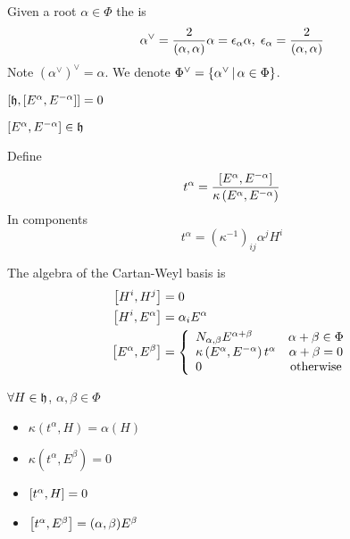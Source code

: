 \documentclass{article}
\begin{document}
\begin{definition}[Coroots]
	Given a root $\alpha\in\Phi$ the  is 
	\[
	\alpha^\vee=\frac{2}{(\alpha,\alpha)}\alpha = \eps_\alpha \alpha, \; \eps_\alpha = \frac{2}{(\alpha,\alpha)}
	\]
	Note $\left( \alpha^\vee \right)^\vee=\alpha$. We denote $\Phi^\vee = \pbrace{\alpha^\vee \, | \, \alpha \in \Phi}$. 
\end{definition}

\begin{lemma}
	$\comm[\mf{h}]{\comm[E^\alpha]{E^{-\alpha}}}=0$
\end{lemma}
\begin{corollary}
	$\comm[E^\alpha]{E^{-\alpha}} \in \mf{h}$
\end{corollary}

\begin{definition}[$t^\alpha$]
	Define 
	\[
	t^\alpha = \frac{\comm[E^\alpha]{E^{-\alpha}}}{\kappa\left(E^\alpha,E^{-\alpha}\right)}
	\]
	In components
	\[
	t^\alpha = \left( \kappa^{-1}\right)_{ij} \alpha^j H^i
	\]
\end{definition}

\begin{theorem}
	The algebra of the Cartan-Weyl basis is 
	\begin{align*}
	\comm[H^i]{H^j} &= 0 \\
	\comm[H^i]{E^\alpha} &= \alpha_i E^\alpha \\
	\comm[E^\alpha]{E^\beta} &= \left\{ \begin{array}{lc} N_{\alpha,\beta}E^{\alpha+\beta} & \alpha+\beta\in\Phi \\
	\kappa\left(E^\alpha,E^{-\alpha}\right)t^\alpha & \alpha+\beta=0 \\
	0 & \text{otherwise}
	\end{array} \right. \\
	\end{align*}
\end{theorem}

\begin{fact}
	$\forall H\in\mf{h}$, $\alpha,\beta\in\Phi$
	\begin{itemize}
		\item $\kappa\left(t^\alpha,H\right)=\alpha(H)$
		\item $\kappa\left(t^\alpha,E^\beta\right)=0$
		\item $\comm[t^\alpha]{H}=0$
		\item $\comm[t^\alpha]{E^\beta}=(\alpha,\beta)E^\beta$
	\end{itemize}
\end{fact}
\end{document}
